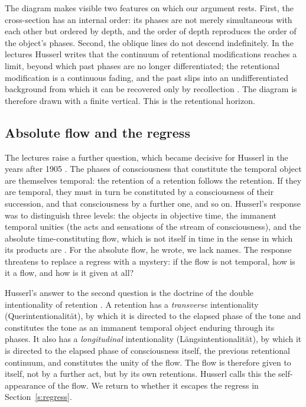 \documentclass{situationist-preprint}
\begin{document}
The diagram makes visible two features on which our argument rests. First, the cross-section has an internal order: its phases are not merely simultaneous with each other but ordered by depth, and the order of depth reproduces the order of the object's phases. Second, the oblique lines do not descend indefinitely. In the lectures Husserl writes that the continuum of retentional modifications reaches a limit, beyond which past phases are no longer differentiated; the retentional modification is a continuous fading, and the past slips into an undifferentiated background from which it can be recovered only by recollection \citep[\S 11]{Husserl1966}. The diagram is therefore drawn with a finite vertical. This is the retentional horizon.

\subsection{Absolute flow and the regress}

The lectures raise a further question, which became decisive for Husserl in the years after 1905 \citep{Brough1972}. The phases of consciousness that constitute the temporal object are themselves temporal: the retention of a retention follows the retention. If they are temporal, they must in turn be constituted by a consciousness of their succession, and that consciousness by a further one, and so on. Husserl's response was to distinguish three levels: the objects in objective time, the immanent temporal unities (the acts and sensations of the stream of consciousness), and the absolute time-constituting flow, which is not itself in time in the sense in which its products are \citep[\S\S 34--36]{Husserl1966}. For the absolute flow, he wrote, we lack names. The response threatens to replace a regress with a mystery: if the flow is not temporal, how is it a flow, and how is it given at all?

Husserl's answer to the second question is the doctrine of the double intentionality of retention \citep[\S 39]{Husserl1966}. A retention has a \emph{transverse} intentionality (Querintentionalit\"at), by which it is directed to the elapsed phase of the tone and constitutes the tone as an immanent temporal object enduring through its phases. It also has a \emph{longitudinal} intentionality (L\"angsintentionalit\"at), by which it is directed to the elapsed phase of consciousness itself, the previous retentional continuum, and constitutes the unity of the flow. The flow is therefore given to itself, not by a further act, but by its own retentions. Husserl calls this the self-appearance of the flow. We return to whether it escapes the regress in Section~\ref{s:regress}.
\end{document}
